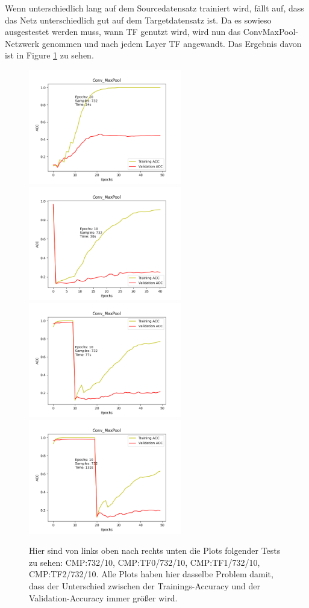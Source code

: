 Wenn unterschiedlich lang auf dem Sourcedatensatz trainiert wird, fällt auf, dass das Netz unterschiedlich gut auf dem Targetdatensatz ist. 
Da es sowieso ausgestestet werden muss, wann TF genutzt wird, wird nun das ConvMaxPool-Netzwerk genommen und nach jedem Layer TF angewandt. 
Das Ergebnis davon ist in Figure \ref{fig:layertf} zu sehen. 

\begin{figure}[htpb]
    \includegraphics[height=5cm]{../../Plots/ba_plots/convmaxpool/wotr.png}
    \includegraphics[height=5cm]{../../Plots/ba_plots/convmaxpool/epochTFtr.png}
    \includegraphics[height=5cm]{../../Plots/ba_plots/convmaxpool/1TFtr.png}
    \includegraphics[height=5cm]{../../Plots/ba_plots/convmaxpool/2TFtr.png}
    \caption{\label{fig:layertf} 
    \small{Hier sind von links oben nach rechts unten die Plots folgender Tests zu sehen: 
    CMP:732/10, CMP:TF0/732/10, CMP:TF1/732/10, CMP:TF2/732/10. Alle Plots haben hier dasselbe Problem damit, dass der Unterschied 
    zwischen der Trainings-Accuracy und der Validation-Accuracy immer größer wird.}}
\end{figure}

